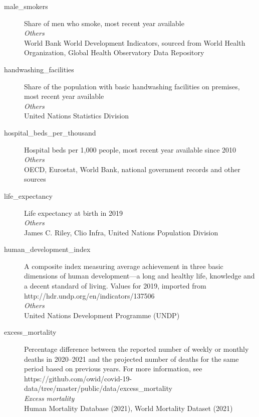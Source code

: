 \begin{description}
    \item[male\_smokers] 
    Share of men who smoke, most recent year available\\
    \emph{\footnotesize{Others}}\\
    \footnotesize{World Bank World Development Indicators, sourced from World Health Organization, Global Health Observatory Data Repository}\\

    \item[handwashing\_facilities] 
    Share of the population with basic handwashing facilities on premises, most recent year available\\
    \emph{\footnotesize{Others}}\\
    \footnotesize{United Nations Statistics Division}\\

    \item[hospital\_beds\_per\_thousand] 
    Hospital beds per 1,000 people, most recent year available since 2010\\
    \emph{\footnotesize{Others}}\\
    \footnotesize{OECD, Eurostat, World Bank, national government records and other sources}\\

    \item[life\_expectancy] 
    Life expectancy at birth in 2019\\
    \emph{\footnotesize{Others}}\\
    \footnotesize{James C. Riley, Clio Infra, United Nations Population Division}\\

    \item[human\_development\_index] 
    A composite index measuring average achievement in three basic dimensions of human development—a long and healthy life, knowledge and a decent standard of living. Values for 2019, imported from http://hdr.undp.org/en/indicators/137506\\
    \emph{\footnotesize{Others}}\\
    \footnotesize{United Nations Development Programme (UNDP)}\\

    \item[excess\_mortality] 
    Percentage difference between the reported number of weekly or monthly deaths in 2020–2021 and the projected number of deaths for the same period based on previous years. For more information, see https://github.com/owid/covid-19-data/tree/master/public/data/excess\_mortality\\
    \emph{\footnotesize{Excess mortality}}\\
    \footnotesize{Human Mortality Database (2021), World Mortality Dataset (2021)}\\


\end{description}
